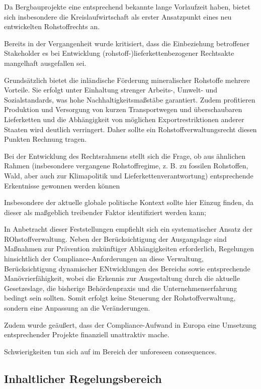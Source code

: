 \documentclass[12pt,a4paper,oneside]{book} %
\begin{document}
Da Bergbauprojekte eine entsprechend bekannte lange Vorlaufzeit haben, bietet sich insbesondere die Kreislaufwirtschaft als erster Ansatzpunkt eines neu entwickelten Rohstoffrechts an.

Bereits in der Vergangenheit wurde kritisiert, dass die Einbeziehung betroffener Stakeholder es bei Entwicklung (rohstoff-)lieferkettenbezogener Rechtsakte mangelhaft ausgefallen sei.

Grundsätzlich bietet die inländische Förderung mineralischer Rohstoffe mehrere Vorteile. Sie erfolgt unter Einhaltung strenger Arbeits-, Umwelt- und Sozialstandards, was hohe Nachhaltigkeitsmaßstäbe garantiert. Zudem profitieren Produktion und Versorgung von kurzen Transportwegen und überschaubaren Lieferketten und  die Abhängigkeit von möglichen Exportrestriktionen anderer Staaten wird deutlich verringert. Daher sollte ein Rohstoffverwaltungsrecht diesen Punkten Rechnung tragen.

Bei der Entwicklung des Rechtsrahmens stellt sich die Frage, ob aus ähnlichen Rahmen (insbesondere vergangene Rohstoffregime, z. B. zu fossilen Rohstoffen, Wald, aber auch zur Klimapolitik und Lieferkettenverantwortung) entsprechende Erkentnisse gewonnen werden können

Insbesondere der aktuelle globale politische Kontext sollte hier Einzug finden, da dieser als maßgeblich treibender Faktor identifiziert werden kann; 

In Anbetracht dieser Feststellungen empfiehlt sich ein systematischer Ansatz der ROhstoffverwaltung. Neben der Berücksichtigung der Ausgangslage sind Maßnahmen zur Prävention zukünftiger Abhängigkeiten erforderlich, Regelungen hinsichtlich der Compliance-Anforderungen an diese Verwaltung, Berücksichtigung dynamischer ENtwicklungen des Bereichs sowie entsprechende Manövrierfähigkeit, wobei die Erkennis zur Ausgestaltung durch die aktuelle Gesetzeslage, die bisherige Behördenpraxis und die Unternehmenserfahrung bedingt sein sollten. Somit erfolgt keine Steuerung der Rohstoffverwaltung, sondern eine Anpassung an die Veränderungen.

Zudem wurde geäußert, dass der Compliance-Aufwand in Europa eine Umsetzung entsprechender Projekte finanziell unattraktiv mache.

Schwierigkeiten tun sich auf im Bereich der \glqq unforeseen consequences\grqq.



\subsection{Inhaltlicher Regelungsbereich}
\end{document}
